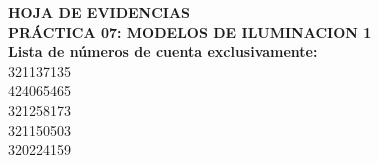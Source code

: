 \documentclass[letterpaper, 11pt]{article}
\newcommand{\numPractica}{07}
\newcommand{\tituloPractica}{Modelos de Iluminacion 1}
\newcommand{\cuentasEvidencias}{
    321137135 \\ 
    424065465 \\ 
    321258173 \\ 
    321150503 \\ 
    320224159 \\ 
}
\begin{document}


\newpage
{}
\setcounter{page}{2}

\begin{center}
    {\Large\bfseries HOJA DE EVIDENCIAS}\\[0.35cm]
    {\large\bfseries PRÁCTICA \numPractica: \MakeUppercase{\tituloPractica}}\\[0.35cm]
    \textbf{Lista de números de cuenta exclusivamente:}\\
    \cuentasEvidencias
\end{center}
\vspace{0.6cm}
\newpage









\end{document}
